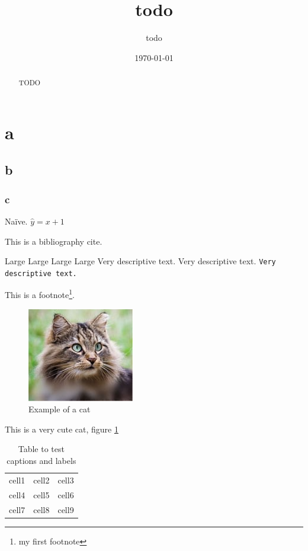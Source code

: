 \documentclass[12pt, a4paper]{article} %
\title{todo}
\author{todo}
\date{\today}
\begin{document}
\maketitle

\tableofcontents

\begin{abstract}
\noindent
  TODO
\end{abstract}


\section{a}\label{a}

\subsection{b}\label{b}

\subsubsection{c}\label{c}

Na\"ive. $\hat{y} = x + 1$

This is a bibliography cite\cite{einstein}.

{\tiny Large}
{\scriptsize Large}
{\footnotesize Large}
{\small Large}
{\large \textrm{Very descriptive text.}}
{\large \textsf{Very descriptive text.}}
{\large \texttt{Very descriptive text.}}

This is a footnote\footnote{my first footnote}.

\begin{figure}[h]
  \centering
  \includegraphics[scale=0.5]{cat}  %
  \caption{Example of a cat}
  \label{fig:cat}
\end{figure}

This is a very cute cat, figure \ref{fig:cat}

\begin{table}
\begin{center}
\begin{tabular}{ |c|c|c| }
 \hline
 cell1 & cell2 & cell3 \\
 cell4 & cell5 & cell6 \\
 cell7 & cell8 & cell9 \\
 \hline
\end{tabular}
\end{center}
\caption{Table to test captions and labels}
\label{table:1}
\end{table}



\end{document}
